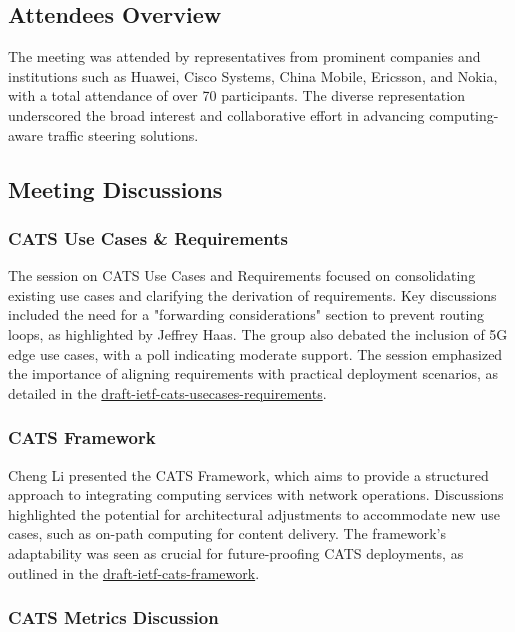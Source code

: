\documentclass{article}
\begin{document}
\subsection{Attendees Overview}

The meeting was attended by representatives from prominent companies and institutions such as Huawei, Cisco Systems, China Mobile, Ericsson, and Nokia, with a total attendance of over 70 participants. The diverse representation underscored the broad interest and collaborative effort in advancing computing-aware traffic steering solutions.

\subsection{Meeting Discussions}

\subsubsection{CATS Use Cases \& Requirements}

The session on CATS Use Cases and Requirements focused on consolidating existing use cases and clarifying the derivation of requirements. Key discussions included the need for a "forwarding considerations" section to prevent routing loops, as highlighted by Jeffrey Haas. The group also debated the inclusion of 5G edge use cases, with a poll indicating moderate support. The session emphasized the importance of aligning requirements with practical deployment scenarios, as detailed in the \href{https://datatracker.ietf.org/doc/html/draft-ietf-cats-usecases-requirements}{draft-ietf-cats-usecases-requirements}.

\subsubsection{CATS Framework}

Cheng Li presented the CATS Framework, which aims to provide a structured approach to integrating computing services with network operations. Discussions highlighted the potential for architectural adjustments to accommodate new use cases, such as on-path computing for content delivery. The framework's adaptability was seen as crucial for future-proofing CATS deployments, as outlined in the \href{https://datatracker.ietf.org/doc/html/draft-ietf-cats-framework}{draft-ietf-cats-framework}.

\subsubsection{CATS Metrics Discussion}
\end{document}
